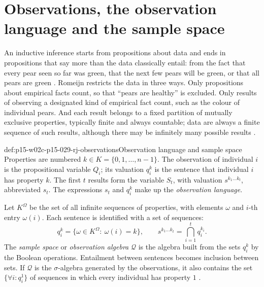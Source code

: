 \section{Observations, the observation language and the sample space}
\label{sec:p15-w02c-p15-029-rj-data}

An inductive inference starts from propositions about data and ends in
propositions that say more than the data classically entail: from the
fact that every pear seen so far was green, that the next few pears will
be green, or that all pears are green \cite[p.~626]{Romeijn2011InductiveLogicStatistics}.
Romeijn restricts the data in three ways. Only propositions about
empirical facts count, so that ``pears are healthy'' is excluded. Only
results of observing a designated kind of empirical fact count, such as
the colour of individual pears. And each result belongs to a fixed
partition of mutually exclusive properties, typically finite and always
countable; data are always a finite sequence of such results, although
there may be infinitely many possible results \cite[pp.~626--627]{Romeijn2011InductiveLogicStatistics}.

\begin{hbdefinition}{def:p15-w02c-p15-029-rj-observations}{Observation language and sample space}
Properties are numbered \(k\in K=\{0,1,\ldots,n-1\}\). The observation
of individual \(i\) is the propositional variable \(Q_i\); its valuation
\(q^k_i\) is the sentence that individual \(i\) has property \(k\). The
first \(t\) results form the variable \(S_t\), with valuation
\(s^{k_1\ldots k_t}\), abbreviated \(s_t\). The expressions \(s_t\) and
\(q^k_i\) make up the \emph{observation language}.

Let \(K^{\Omega}\) be the set of all infinite sequences of properties,
with elements \(\omega\) and \(i\)-th entry \(\omega(i)\). Each sentence
is identified with a set of sequences:
\[
 q^k_i=\{\omega\in K^{\Omega}:\ \omega(i)=k\},\qquad
 s^{k_1\ldots k_t}=\bigcap_{i=1}^{t} q^{k_i}_i .
\]
The \emph{sample space} or \emph{observation algebra} \(\mathcal Q\) is
the algebra built from the sets \(q^k_i\) by the Boolean operations.
Entailment between sentences becomes inclusion between sets. If
\(\mathcal Q\) is the \(\sigma\)-algebra generated by the observations,
it also contains the set \(\{\forall i: q^1_i\}\) of sequences in which
every individual has property \(1\)
\cite[pp.~627--628 and n.~1]{Romeijn2011InductiveLogicStatistics}.
\end{hbdefinition}

